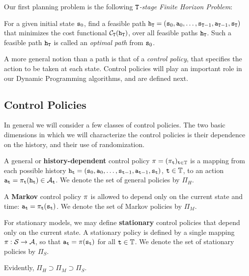 Our first planning problem is the following \emph{${\tt T}$-stage
Finite Horizon Problem}:

\begin{definition}
    For a given initial state ${{\tt s}_0}$, find a feasible path
  ${{\tt h}_{\tt T}} = ({{\tt s}_0},{{\tt a}_0}, \ldots ,{{\tt s}_{{\tt T} - 1}},{{\tt a}_{{\tt T} - 1}},{{\tt s}_{\tt T}})$
  that minimizes the cost functional ${\mathcal{C}_{\tt T}}({{\tt h}_{\tt T}})$, over all feasible paths ${{\tt h}_{\tt T}}$. Such a feasible path ${{\tt h}_{\tt T}}$ is called an
\emph{optimal path} from ${{\tt s}_0}$.
\end{definition}

A more general notion than a path is that of a \emph{control
policy}, that specifies the action to be taken at each state.
Control policies will play an important role in our Dynamic
Programming algorithms, and are defined next.

\subsection{Control Policies}

In general we will consider a few classes of control policies. The
two basic dimensions in which we will characterize the control
policies is their dependence on the history, and their use of
randomization.


\begin{definition}
    A general or \textbf{history-dependent} control policy $\pi  =
{({\pi _{\tt t}})_{{\tt t} \in \mathbb{T}}}$ is a mapping from each
possible history ${{\tt h}_{\tt t}} = ({{\tt s}_0},{{\tt a}_0},
\ldots ,{{\tt s}_{{\tt t}-1}},{{\tt a}_{{\tt t}-1}},{{\tt s}_{\tt t}})$,
${\tt t} \in \mathbb{T}$, to an action ${{\tt a}_{\tt t}} = {\pi
_{\tt t}}({{\tt h}_{\tt t}}) \in {\mathcal{A}_{\tt t}}$.  We denote the
set of general policies by ${\Pi _H}$.
\end{definition}
\begin{definition}
    A \textbf{Markov} control policy $\pi $ is allowed to depend only on
the current state and time: ${{\tt a}_{\tt t}} = {\pi
_{\tt t}}({{\tt s}_{\tt t}})$.   We denote the set of Markov policies
by ${\Pi _M}$.
\end{definition}
\begin{definition}
    For stationary models, we may define \textbf{stationary} control
policies that depend only on the current state. A stationary policy
is defined by a single mapping $\pi :\mathcal{S} \to \mathcal{A}$, so
that ${{\tt a}_{\tt t}} = \pi ({{\tt s}_{\tt t}})$ for all ${\tt t}
\in \mathbb{T}$. We denote the set of stationary policies by ${\Pi _S}$.
\end{definition}
Evidently, ${\Pi _H} \supset {\Pi _M} \supset {\Pi _S}$.


